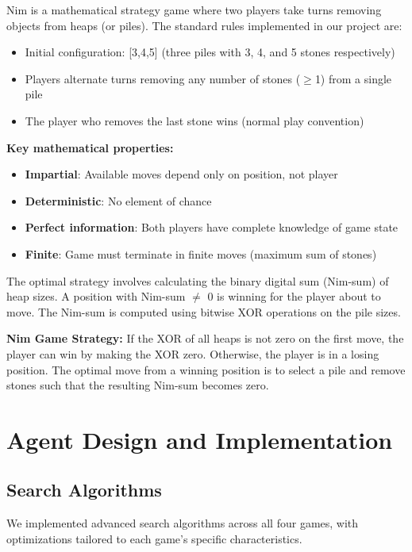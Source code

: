 \documentclass[12pt]{article}
\begin{document}
Nim is a mathematical strategy game where two players take turns removing objects from heaps (or piles). The standard rules implemented in our project are:

\begin{itemize}
    \item Initial configuration: [3,4,5] (three piles with 3, 4, and 5 stones respectively)
    \item Players alternate turns removing any number of stones ($\geq$1) from a single pile
    \item The player who removes the last stone wins (normal play convention)
\end{itemize}

\textbf{Key mathematical properties:}
\begin{itemize}
    \item \textbf{Impartial}: Available moves depend only on position, not player
    \item \textbf{Deterministic}: No element of chance
    \item \textbf{Perfect information}: Both players have complete knowledge of game state
    \item \textbf{Finite}: Game must terminate in finite moves (maximum sum of stones)
\end{itemize}

The optimal strategy involves calculating the binary digital sum (Nim-sum) of heap sizes. A position with Nim-sum $\neq$ 0 is winning for the player about to move. The Nim-sum is computed using bitwise XOR operations on the pile sizes.

\textbf{Nim Game Strategy:} If the XOR of all heaps is not zero on the first move, the player can win by making the XOR zero. Otherwise, the player is in a losing position. The optimal move from a winning position is to select a pile and remove stones such that the resulting Nim-sum becomes zero.

\section{Agent Design and Implementation}

\subsection{Search Algorithms}

We implemented advanced search algorithms across all four games, with optimizations tailored to each game's specific characteristics.
\end{document}
